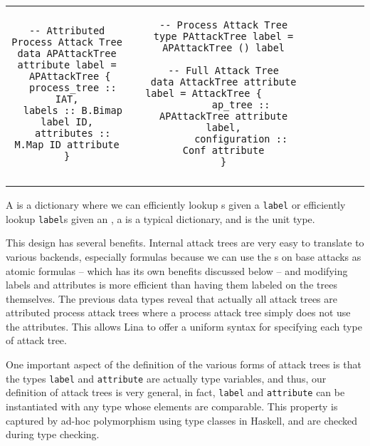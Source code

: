 \begin{tabular}{cccccccc}
  \\ 
  \begin{minipage}{2in}        
    \begin{verbatim}
-- Attributed Process Attack Tree
data APAttackTree attribute label =
 APAttackTree {
  process_tree :: IAT,
  labels :: B.Bimap label ID,
  attributes :: M.Map ID attribute
 } 
    \end{verbatim}
    \vspace{-2px}
  \end{minipage}  
  & \quad &
  \begin{minipage}{1in}        
    \begin{verbatim}
-- Process Attack Tree
type PAttackTree label = APAttackTree () label

-- Full Attack Tree
data AttackTree attribute label = AttackTree {            
      ap_tree :: APAttackTree attribute label,
      configuration :: Conf attribute
}
    \end{verbatim}
  \end{minipage}
  \\\\
\end{tabular}

\noindent
A  is a dictionary where we can efficiently lookup
s given a \verb!label! or efficiently lookup \verb!label!s given an
, a  is a typical dictionary, and \mh{()} is the unit
type.

This design has several benefits. Internal attack trees are very easy
to translate to various backends, especially formulas because we can
use the s on base attacks as atomic formulas -- which has its
own benefits discussed below -- and modifying labels and attributes is
more efficient than having them labeled on the trees themselves.  The
previous data types reveal that actually all attack trees are
attributed process attack trees where a process attack tree simply
does not use the attributes.  This allows Lina to offer a uniform
syntax for specifying each type of attack tree.

One important aspect of the definition of the various forms of attack
trees is that the types \verb!label! and \verb!attribute! are actually
type variables, and thus, our definition of attack trees is very
general, in fact, \verb!label! and \verb!attribute! can be
instantiated with any type whose elements are comparable.  This
property is captured by ad-hoc polymorphism using type classes in
Haskell, and are checked during type checking.

